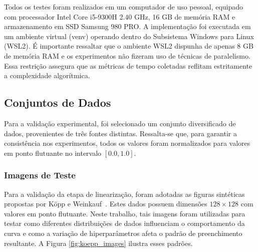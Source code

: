 \documentclass[12pt]{article}
\begin{document}
Todos os testes foram realizados em um computador de uso pessoal, equipado com processador Intel Core
i5-9300H 2.40 GHz, 16 GB de memória RAM e armazenamento em SSD Samsung 980 PRO. A implementação foi
executada em um ambiente virtual (venv) operando dentro do Subsistema Windows para Linux (WSL2). 
É importante ressaltar que o ambiente WSL2 dispunha de apenas 8 GB de memória RAM e os experimentos não
fizeram uso de técnicas de paralelismo. Essa restrição assegura que as métricas de tempo coletadas reflitam
estritamente a complexidade algorítmica.

\subsection{Conjuntos de Dados}
Para a validação experimental, foi selecionado um conjunto diversificado de dados, provenientes de três fontes distintas.
Ressalta-se que, para garantir a consistência nos experimentos, todos os valores foram normalizados
para valores em ponto flutuante no intervalo $[0.0, 1.0]$.

\subsubsection{Imagens de Teste}
Para a validação da etapa de linearização, foram adotadas as figuras sintéticas propostas por
Köpp e Weinkauf~\cite{KoeppWeinkauf2022_TMTM}. Estes dados possuem dimensões $128 \times 128$ com
valores em ponto flutuante. Neste trabalho, tais imagens foram utilizadas para testar como diferentes distribuições de dados
influenciam o comportamento da curva e como a variação de hiperparâmetros afeta o padrão de preenchimento resultante.
A Figura \ref{fig:koepp_images} ilustra esses padrões.
\end{document}
